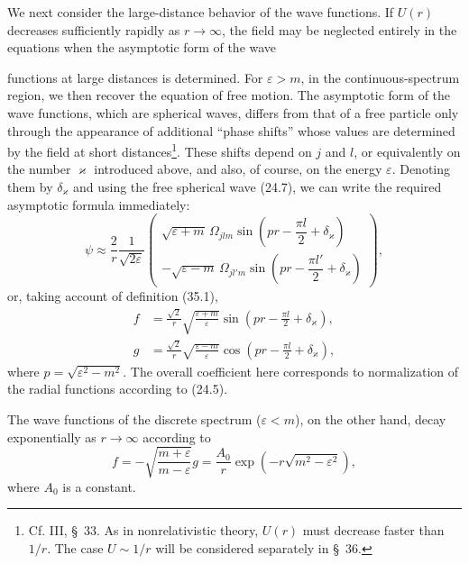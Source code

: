 We next consider the large-distance behavior of the wave functions. If $U(r)$ decreases sufficiently rapidly as $r\to\infty$, the field may be neglected entirely in the equations when the asymptotic form of the wave

functions at large distances is determined. For $\varepsilon>m$, in the continuous-spectrum region, we then recover the equation of free motion. The asymptotic form of the wave functions, which are spherical waves, differs from that of a free particle only through the appearance of additional ``phase shifts'' whose values are determined by the field at short distances\footnote{Cf. III, \S~33. As in nonrelativistic theory, $U(r)$ must decrease faster than $1/r$. The case $U\sim1/r$ will be considered separately in \S~36.}. These shifts depend on $j$ and $l$, or equivalently on the number $\varkappa$ introduced above, and also, of course, on the energy $\varepsilon$. Denoting them by $\delta_\varkappa$ and using the free spherical wave (24.7), we can write the required asymptotic formula immediately:
\begin{equation}
\psi\approx\frac2r\frac1{\sqrt{2\varepsilon}}
\begin{pmatrix}
\sqrt{\varepsilon+m}\,\Omega_{jlm}\sin\left(pr-\dfrac{\pi l}{2}+\delta_\varkappa\right)\\
-\sqrt{\varepsilon-m}\,\Omega_{jl'm}\sin\left(pr-\dfrac{\pi l'}{2}+\delta_\varkappa\right)
\end{pmatrix},
\tag{35.7}
\end{equation}
or, taking account of definition (35.1),
\begin{equation}
\begin{aligned}
f&=\frac{\sqrt2}{r}\sqrt{\frac{\varepsilon+m}{\varepsilon}}
\sin\left(pr-\frac{\pi l}{2}+\delta_\varkappa\right),\\
g&=\frac{\sqrt2}{r}\sqrt{\frac{\varepsilon-m}{\varepsilon}}
\cos\left(pr-\frac{\pi l}{2}+\delta_\varkappa\right),
\end{aligned}
\tag{35.8}
\end{equation}
where $p=\sqrt{\varepsilon^2-m^2}$. The overall coefficient here corresponds to normalization of the radial functions according to (24.5).

The wave functions of the discrete spectrum ($\varepsilon<m$), on the other hand, decay exponentially as $r\to\infty$ according to
\begin{equation}
f=-\sqrt{\frac{m+\varepsilon}{m-\varepsilon}}g
=\frac{A_0}{r}\exp\left(-r\sqrt{m^2-\varepsilon^2}\right),
\tag{35.9}
\end{equation}
where $A_0$ is a constant.

